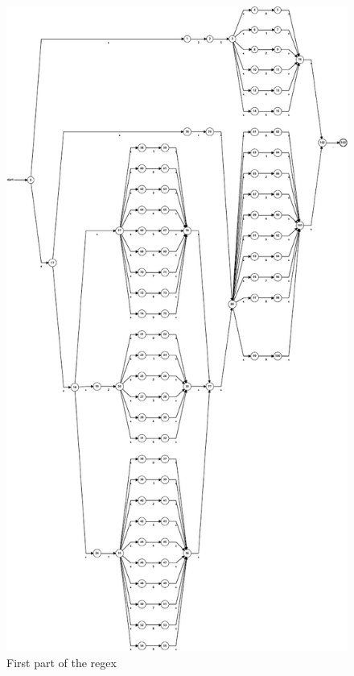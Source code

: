 \documentclass[a3paper]{report}
\begin{document}
\begin{figure}[h]
    \centering
    \includegraphics[scale=1]{Automatas/automata_01.pdf}
    \caption{First part of the regex}
\end{figure}
\end{document}
